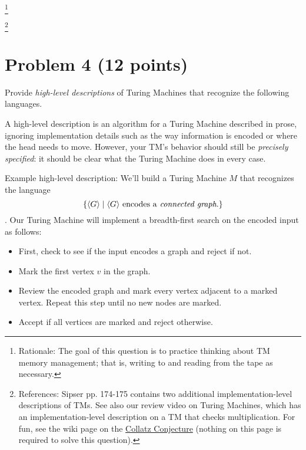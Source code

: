 \documentclass[letterpaper,11pt,twoside]{article}
\theoremstyle{plain}
\theoremstyle{definition}
\theoremstyle{remark}
\theoremstyle{restate}
\newcommand\blfootnote[1]{%
  \begingroup
  \renewcommand\thefootnote{}\footnote{#1}%
  \addtocounter{footnote}{-1}%
  \endgroup
}
\begin{document}
    
    \blfootnote{ Rationale: The goal of this question is to practice thinking about TM memory management; that is, writing to and reading from the tape as necessary. }
    \blfootnote{ References: Sipser pp. 174-175 contains two additional implementation-level descriptions of TMs. See also our review video on Turing Machines, which has an implementation-level description on a TM that checks multiplication. For fun, see the wiki page on the \href{https://en.wikipedia.org/wiki/Collatz_conjecture}{Collatz Conjecture} (nothing on this page is required to solve this question). }
    
\clearpage
\section{Problem 4 (12 points)}
Provide \emph{high-level descriptions} of Turing Machines that recognize the following languages. 

A high-level description is an algorithm for a Turing Machine described in prose, ignoring implementation details such as the way information is encoded or where the head needs to move. However, your TM's behavior should still be \emph{precisely specified}: it should be clear what the Turing Machine does in every case.

Example high-level description: We'll build a Turing Machine $M$ that recognizes the language 
\[
    \{\langle G\rangle \; | \; \langle G \rangle \text{ encodes a\emph{ connected graph}.}\}
\].
Our Turing Machine will implement a breadth-first search on the encoded input as follows:
\begin{itemize}
    \item First, check to see if the input encodes a graph and reject if not.
    \item Mark the first vertex $v$ in the graph.
    \item Review the encoded graph and mark every vertex adjacent to a marked vertex. Repeat this step until no new nodes are marked.
    \item Accept if all vertices are marked and reject otherwise.
\end{itemize}
\end{document}
